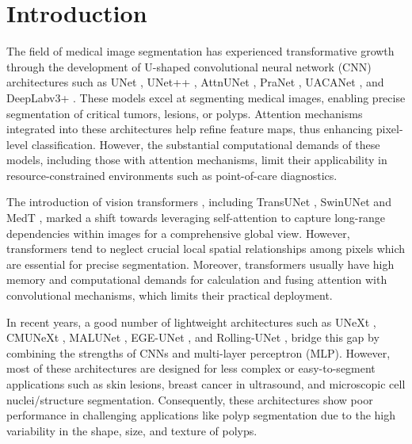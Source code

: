 \section{Introduction}
\label{sec:introduction}

The field of medical image segmentation has experienced transformative growth through the development of U-shaped convolutional neural network (CNN) architectures \cite{ronneberger2015u,oktay2018attention,zhou2018unet++,fan2020pranet} such as UNet \cite{ronneberger2015u}, UNet++ \cite{zhou2018unet++}, AttnUNet \cite{oktay2018attention}, PraNet \cite{fan2020pranet}, UACANet \cite{kim2021uacanet}, and DeepLabv3+ \cite{chen2017deeplab}. These models excel at segmenting medical images, enabling precise segmentation of critical tumors, lesions, or polyps. Attention mechanisms \cite{oktay2018attention,fan2020pranet,woo2018cbam} integrated into these architectures help refine feature maps, thus enhancing pixel-level classification. However, the substantial computational demands of these models, including those with attention mechanisms, limit their applicability in resource-constrained environments such as point-of-care diagnostics.

The introduction of vision transformers \cite{chen2021transunet,cao2021swin,rahman2024g,Rahman_2023_WACV,rahman2023multi,rahman2024emcad,valanarasu2021medical}, including TransUNet \cite{chen2021transunet}, SwinUNet \cite{cao2021swin} and MedT \cite{valanarasu2021medical}, marked a shift towards leveraging self-attention to capture long-range dependencies within images for a comprehensive global view. However, transformers tend to neglect crucial local spatial relationships among pixels which are essential for precise segmentation. Moreover, transformers usually have high memory and computational demands for calculation and fusing attention with convolutional mechanisms, which limits their practical deployment. 

In recent years, a good number of lightweight architectures such as UNeXt \cite{valanarasu2022unext}, CMUNeXt \cite{tang2023cmunext}, MALUNet \cite{ruan2022malunet}, EGE-UNet \cite{ruan2023ege}, and Rolling-UNet \cite{liu2024rolling}, bridge this gap by combining the strengths of CNNs and multi-layer perceptron (MLP). However, most of these architectures are designed for less complex or easy-to-segment applications such as skin lesions, breast cancer in ultrasound, and microscopic cell nuclei/structure segmentation. Consequently, these architectures show poor performance in challenging applications like polyp segmentation due to the high variability in the shape, size, and texture of polyps.


